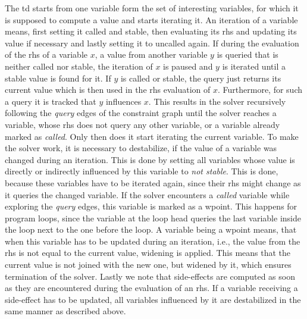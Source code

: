   \noindent The \ac{td} starts from one variable form the set of interesting variables, for which it is supposed to compute a value and starts iterating it. An iteration of a variable means, first setting it called and stable, then evaluating its \ac{rhs} and updating its value if necessary and lastly setting it to uncalled again. If during the evaluation of the \ac{rhs} of a variable $x$, a value from another variable $y$ is queried that is neither called nor stable, the iteration of $x$ is paused and $y$ is iterated until a stable value is found for it. If $y$ is called or stable, the query just returns its current value which is then used in the \ac{rhs} evaluation of $x$. Furthermore, for such a query it is tracked that $y$ influences $x$. This results in the solver recursively following the \textit{query} edges of the constraint graph until the solver reaches a variable, whose \ac{rhs} does not query any other variable, or a variable already marked as \textit{called}. Only then does it start iterating the current variable.
  To make the solver work, it is necessary to destabilize, if the value of a variable was changed during an iteration. This is done by setting all variables whose value is directly or indirectly influenced by this variable to \textit{not stable}. This is done, because these variables have to be iterated again, since their \ac{rhs} might change as it queries the changed variable.
  If the solver encounters a \textit{called} variable while exploring the \textit{query} edges, this variable is marked as a wpoint. This happens for program loops, since the variable at the loop head queries the last variable inside the loop next to the one before the loop. A variable being a wpoint means, that when this variable has to be updated during an iteration, i.e., the value from the \ac{rhs} is not equal to the current value, widening is applied. This means that the current value is not joined with the new one, but widened by it, which ensures termination of the solver. 
  Lastly we note that side-effects are computed as soon as they are encountered during the evaluation of an \ac{rhs}. If a variable receiving a side-effect has to be updated, all variables influenced by it are destabilized in the same manner as described above.
